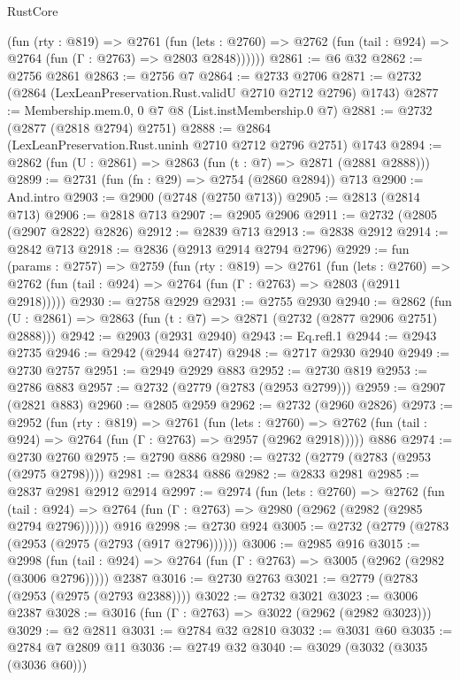 \begin{lexlean}{RustCore}
\begin{coremodule}
        (fun (rty : @819) =>
        @2761
          (fun (lets : @2760) =>
          @2762 (fun (tail : @924) => @2764 (fun (Γ : @2763) => @2803 @2848))))))
@2861 := @6 @32
@2862 := @2756 @2861
@2863 := @2756 @7
@2864 := @2733 @2706
@2871 := @2732 (@2864 (LexLeanPreservation.Rust.validU @2710 @2712 @2796) @1743)
@2877 := Membership.mem.{0, 0} @7 @8 (List.instMembership.{0} @7)
@2881 := @2732 (@2877 (@2818 @2794) @2751)
@2888 := @2864 (LexLeanPreservation.Rust.uninh @2710 @2712 @2796 @2751) @1743
@2894 := @2862 (fun (U : @2861) => @2863 (fun (t : @7) => @2871 (@2881 @2888)))
@2899 := @2731 (fun (fn : @29) => @2754 (@2860 @2894)) @713
@2900 := And.intro
@2903 := @2900 (@2748 (@2750 @713))
@2905 := @2813 (@2814 @713)
@2906 := @2818 @713
@2907 := @2905 @2906
@2911 := @2732 (@2805 (@2907 @2822) @2826)
@2912 := @2839 @713
@2913 := @2838 @2912
@2914 := @2842 @713
@2918 := @2836 (@2913 @2914 @2794 @2796)
@2929 := fun (params : @2757) =>
  @2759
    (fun (rty : @819) =>
    @2761
      (fun (lets : @2760) =>
      @2762 (fun (tail : @924) => @2764 (fun (Γ : @2763) => @2803 (@2911 @2918)))))
@2930 := @2758 @2929
@2931 := @2755 @2930
@2940 := @2862 (fun (U : @2861) => @2863 (fun (t : @7) => @2871 (@2732 (@2877 @2906 @2751) @2888)))
@2942 := @2903 (@2931 @2940)
@2943 := Eq.refl.{1}
@2944 := @2943 @2735
@2946 := @2942 (@2944 @2747)
@2948 := @2717 @2930 @2940
@2949 := @2730 @2757
@2951 := @2949 @2929 @883
@2952 := @2730 @819
@2953 := @2786 @883
@2957 := @2732 (@2779 (@2783 (@2953 @2799)))
@2959 := @2907 (@2821 @883)
@2960 := @2805 @2959
@2962 := @2732 (@2960 @2826)
@2973 := @2952
    (fun (rty : @819) =>
    @2761
      (fun (lets : @2760) =>
      @2762 (fun (tail : @924) => @2764 (fun (Γ : @2763) => @2957 (@2962 @2918)))))
    @886
@2974 := @2730 @2760
@2975 := @2790 @886
@2980 := @2732 (@2779 (@2783 (@2953 (@2975 @2798))))
@2981 := @2834 @886
@2982 := @2833 @2981
@2985 := @2837 @2981 @2912 @2914
@2997 := @2974
    (fun (lets : @2760) =>
    @2762
      (fun (tail : @924) => @2764 (fun (Γ : @2763) => @2980 (@2962 (@2982 (@2985 @2794 @2796))))))
    @916
@2998 := @2730 @924
@3005 := @2732 (@2779 (@2783 (@2953 (@2975 (@2793 (@917 @2796))))))
@3006 := @2985 @916
@3015 := @2998
    (fun (tail : @924) => @2764 (fun (Γ : @2763) => @3005 (@2962 (@2982 (@3006 @2796)))))
    @2387
@3016 := @2730 @2763
@3021 := @2779 (@2783 (@2953 (@2975 (@2793 @2388))))
@3022 := @2732 @3021
@3023 := @3006 @2387
@3028 := @3016 (fun (Γ : @2763) => @3022 (@2962 (@2982 @3023)))
@3029 := @2 @2811
@3031 := @2784 @32 @2810
@3032 := @3031 @60
@3035 := @2784 @7 @2809 @11
@3036 := @2749 @32
@3040 := @3029 (@3032 (@3035 (@3036 @60)))

\end{coremodule}
\end{lexlean}
